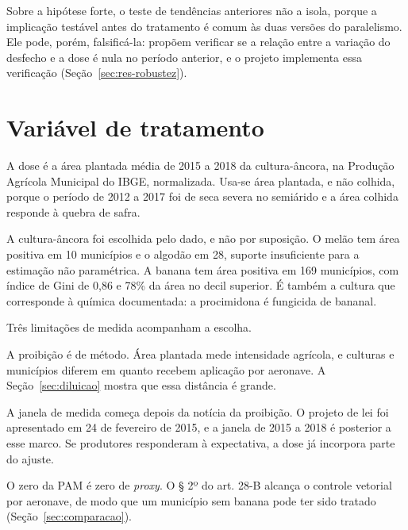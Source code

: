 Sobre a hipótese forte, o teste de tendências anteriores não a isola, porque a
implicação testável antes do tratamento é comum às duas versões do paralelismo.
Ele pode, porém, falsificá-la: \citet{callaway2024continuous} propõem verificar
se a relação entre a variação do desfecho e a dose é nula no período anterior,
e o projeto implementa essa verificação (Seção~\ref{sec:res-robustez}).

\section{Variável de tratamento}
\label{sec:dose}

A dose é a área plantada média de 2015 a 2018 da cultura-âncora, na Produção
Agrícola Municipal do IBGE, normalizada. Usa-se área plantada, e não colhida,
porque o período de 2012 a 2017 foi de seca severa no semiárido e a área
colhida responde à quebra de safra.

A cultura-âncora foi escolhida pelo dado, e não por suposição. O melão tem área
positiva em 10 municípios e o algodão em 28, suporte insuficiente para a
estimação não paramétrica. A banana tem área positiva em 169 municípios, com
índice de Gini de 0,86 e 78\% da área no decil superior. É também a cultura que
corresponde à química documentada: a procimidona é fungicida de bananal.

Três limitações de medida acompanham a escolha.

\begin{alineas}
  \item A proibição é de método. Área plantada mede intensidade agrícola, e
    culturas e municípios diferem em quanto recebem aplicação por aeronave. A
    Seção~\ref{sec:diluicao} mostra que essa distância é grande.
  \item A janela de medida começa depois da notícia da proibição. O projeto de
    lei foi apresentado em 24 de fevereiro de 2015, e a janela de 2015 a 2018 é
    posterior a esse marco. Se produtores responderam à expectativa, a dose já
    incorpora parte do ajuste. 
  \item O zero da PAM é zero de \emph{proxy}. O § 2º do art. 28-B alcança o
    controle vetorial por aeronave, de modo que um município sem banana pode
    ter sido tratado (Seção~\ref{sec:comparacao}).
\end{alineas}

